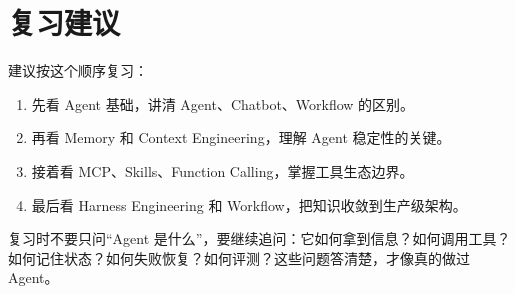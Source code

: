 \documentclass[10pt,a4paper]{ctexart}
\begin{document}
\section{复习建议}


建议按这个顺序复习：


\begin{enumerate}[itemsep=2pt, topsep=4pt]
  \item 先看 Agent 基础，讲清 Agent、Chatbot、Workflow 的区别。
  \item 再看 Memory 和 Context Engineering，理解 Agent 稳定性的关键。
  \item 接着看 MCP、Skills、Function Calling，掌握工具生态边界。
  \item 最后看 Harness Engineering 和 Workflow，把知识收敛到生产级架构。
\end{enumerate}


复习时不要只问“Agent 是什么”，要继续追问：它如何拿到信息？如何调用工具？如何记住状态？如何失败恢复？如何评测？这些问题答清楚，才像真的做过 Agent。
\end{document}

